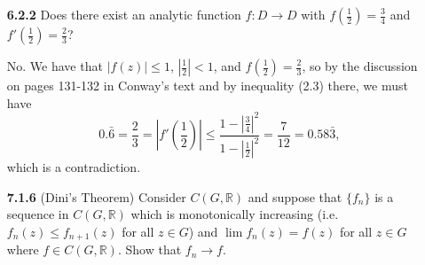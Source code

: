 \documentclass[11pt,oneside,english]{amsart}
\theoremstyle{definition}
\newcommand{\MB}[1]{\mathbb{#1}}
\begin{document}
\begin{enumerate}[leftmargin=*]
\begin{proof}
Our aim is to apply Schwarz's lemma [Con, p. 130] to $g$, so we must show that $|g(z)|\leq 1$ and $g(0)=0$. First, since $a=f(0)$ and $|f(z)|\leq 1$, we have that $|f(z)-a|\leq 1$, so
\[
|g(z)|=\frac{|f(z)-a|}{|1-\bar af(z)|}\leq \frac{1}{|1-\bar a f(z)|}\leq 1.
\]
Next,
\[
g(0)=\frac{f(0)-a}{1-\bar af(0)}=\frac{a-a}{1-\bar aa}=0,
\]
so by Schwarz's lemma, $|g(z)|\leq |z|$ for $z\in D$. Consequently, by the reverse triangle inequality
\begin{align*}
\frac{|f(z)-a|}{|1-\bar af(z)|}&\leq|z|\\[2mm]
|f(z)-a|&\leq |1-\bar af(z)||z|\\[2mm]
||f(z)|-|a||&\leq(|1|+|\bar af(z)|)|z|\\[2mm]
-|z|-|z||a||f(z)|&\leq|f(z)|-|a|\leq|z|+|z||a||f(z)|\\[2mm]
\frac{|a|-|z|}{1+|a||z|}&\leq|f(z)|\leq\frac{|a|+|z|}{1-|a||z|}\\[2mm]
\frac{|f(0)|-|z|}{1+|f(0)||z|}&\leq|f(z)|\leq\frac{|f(0)|+|z|}{1-|f(0)||z|}.
\end{align*}\qedhere
\end{proof}


\item[\textbf{6.2.2}] Does there exist an analytic function $f:D\to D$ with $f(\frac{1}{2})=\frac{3}{4}$ and $f'(\frac{1}{2})=\frac{2}{3}$?

No. We have that $|f(z)|\leq 1$, $\left|\frac{1}{2}\right|<1$, and $f(\frac{1}{2})=\frac{2}{3}$, so by the discussion on pages 131-132 in Conway's text and by inequality (2.3) there, we must have
\[
0.\bar6=\frac{2}{3}=\left|f'\left(\frac{1}{2}\right)\right|\leq\frac{1-\left|\frac{3}{4}\right|^2}{1-\left|\frac{1}{2}\right|^2}=\frac{7}{12}=0.58\bar3,
\]
which is a contradiction.

\item[\textbf{7.1.6}] (Dini's Theorem) Consider $C(G,\MB{R})$ and suppose that $\{f_n\}$ is a sequence in $C(G,\MB{R})$ which is monotonically increasing (i.e. $f_n(z)\leq f_{n+1}(z)$ for all $z\in G$) and $\lim f_n(z)=f(z)$ for all $z\in G$ where $f\in C(G,\MB{R})$. Show that $f_n\to f$. 


\end{enumerate}
\end{document}
